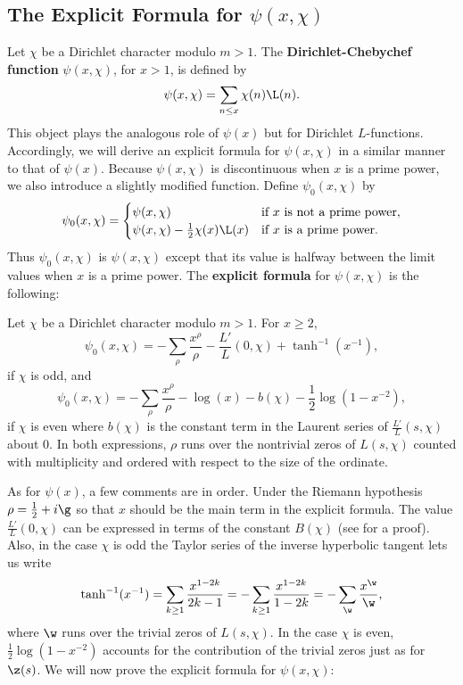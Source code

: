     \subsection*{The Explicit Formula for \texorpdfstring{$\psi(x,\chi)$}{$\psi(x,\chi)$}}
      Let $\chi$ be a Dirichlet character modulo $m > 1$. The \textbf{Dirichlet-Chebychef function} $\psi(x,\chi)$, for $x > 1$, is defined by
      \[
        \psi(x,\chi) = \sum_{n \le x}\chi(n)\L(n).
      \]
      This object plays the analogous role of $\psi(x)$ but for Dirichlet $L$-functions. Accordingly, we will derive an explicit formula for $\psi(x,\chi)$ in a similar manner to that of $\psi(x)$. Because $\psi(x,\chi)$ is discontinuous when $x$ is a prime power, we also introduce a slightly modified function. Define $\psi_{0}(x,\chi)$ by
      \[
        \psi_{0}(x,\chi) = \begin{cases} \psi(x,\chi) & \text{if $x$ is not a prime power}, \\ \psi(x,\chi)-\frac{1}{2}\chi(x)\L(x) & \text{if $x$ is a prime power}. \end{cases}
      \]
      Thus $\psi_{0}(x,\chi)$ is $\psi(x,\chi)$ except that its value is halfway between the limit values when $x$ is a prime power. The \textbf{explicit formula} for $\psi(x,\chi)$ is the following:

      \begin{theorem}
        Let $\chi$ be a Dirichlet character modulo $m > 1$. For $x \ge 2$,
        \[
          \psi_{0}(x,\chi) = -\sum_{\rho}\frac{x^{\rho}}{\rho}-\frac{L'}{L}(0,\chi)+\tanh^{-1}(x^{-1}),
        \]
        if $\chi$ is odd, and
        \[
          \psi_{0}(x,\chi) = -\sum_{\rho}\frac{x^{\rho}}{\rho}-\log(x)-b(\chi)-\frac{1}{2}\log(1-x^{-2}),
        \]
        if $\chi$ is even where $b(\chi)$ is the constant term in the Laurent series of $\frac{L'}{L}(s,\chi)$ about $0$. In both expressions, $\rho$ runs over the nontrivial zeros of $L(s,\chi)$ counted with multiplicity and ordered with respect to the size of the ordinate.
      \end{theorem}

      As for $\psi(x)$, a few comments are in order. Under the Riemann hypothesis $\rho = \frac{1}{2}+i\g$ so that $x$ should be the main term in the explicit formula. The value $\frac{L'}{L}(0,\chi)$ can be expressed in terms of the constant $B(\chi)$ (see \cite{davenport1980multiplicative} for a proof). Also, in the case $\chi$ is odd the Taylor series of the inverse hyperbolic tangent lets us write
      \[
        \tanh^{-1}(x^{-1}) = \sum_{k \ge 1}\frac{x^{1-2k}}{2k-1} = -\sum_{k \ge 1}\frac{x^{1-2k}}{1-2k} = -\sum_{\w}\frac{x^{\w}}{\w},
      \]
      where $\w$ runs over the trivial zeros of $L(s,\chi)$. In the case $\chi$ is even, $\frac{1}{2}\log(1-x^{-2})$ accounts for the contribution of the trivial zeros just as for $\z(s)$. We will now prove the explicit formula for $\psi(x,\chi)$:

